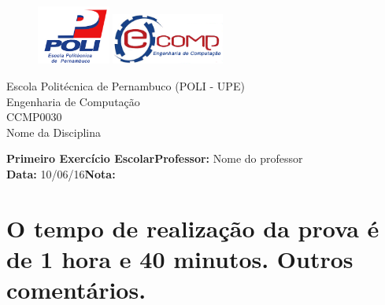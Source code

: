 \documentclass[12pt]{article}
\begin{document}
	
	\thispagestyle{empty}

	\begin{center}
		\begin{figure}[!htp]
		    {\includegraphics[scale=0.2, width=2.4cm]{../imagens/poli.png}}\hfill%
		    {\includegraphics[scale=0.3, width=3.7cm]{../imagens/ecomp.png}}%
  		\end{figure}
  		\begin{framed}
  			Escola Politécnica de Pernambuco (POLI - UPE) \\ Engenharia de Computação\\[0.2cm] \textsf{CCMP0030} \\ \textsf{Nome da Disciplina}
  		\end{framed} 
	\end{center}
	
	\begin{flushleft}
		\textbf{Primeiro Exercício Escolar}\hspace{4.5cm}\textbf{Professor:} Nome do professor\\
		\textbf{Data:} 10/06/16\hspace{7.9cm}\textbf{Nota: }
		\begin{center}
			\hrulefill
		\end{center}
	\end{flushleft}

	\section*{\small{O tempo de realização da prova é de 1 hora e 40 minutos. Outros comentários.}}
\end{document}
